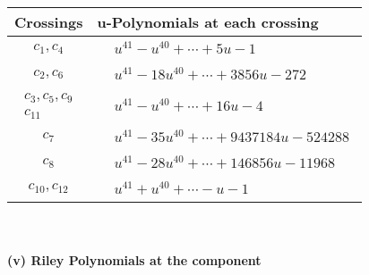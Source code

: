 \documentclass[1p]{elsarticle_modified}
\theoremstyle{definition}
\begin{document}
\begin{tabular}{m{50pt}|m{274pt}}
Crossings & \hspace{64pt}u-Polynomials at each crossing \\
\hline $$\begin{aligned}c_{1},c_{4}\end{aligned}$$&$\begin{aligned}
&u^{41}- u^{40}+\cdots+5 u-1
\end{aligned}$\\
\hline $$\begin{aligned}c_{2},c_{6}\end{aligned}$$&$\begin{aligned}
&u^{41}-18 u^{40}+\cdots+3856 u-272
\end{aligned}$\\
\hline $$\begin{aligned}c_{3},c_{5},c_{9}\\c_{11}\end{aligned}$$&$\begin{aligned}
&u^{41}- u^{40}+\cdots+16 u-4
\end{aligned}$\\
\hline $$\begin{aligned}c_{7}\end{aligned}$$&$\begin{aligned}
&u^{41}-35 u^{40}+\cdots+9437184 u-524288
\end{aligned}$\\
\hline $$\begin{aligned}c_{8}\end{aligned}$$&$\begin{aligned}
&u^{41}-28 u^{40}+\cdots+146856 u-11968
\end{aligned}$\\
\hline $$\begin{aligned}c_{10},c_{12}\end{aligned}$$&$\begin{aligned}
&u^{41}+u^{40}+\cdots- u-1
\end{aligned}$\\
\hline
\end{tabular}\\~\\
\newpage\renewcommand{\arraystretch}{1}
\flushleft \textbf{(v) Riley Polynomials at the component}\newline \\
\end{document}
